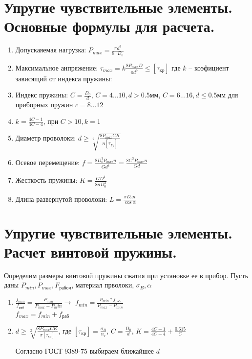 \documentclass{article}
\begin{document}
\begin{multicols}{3}
\section {\tiny Упругие чувствительные элементы. Основные формулы для расчета.}

\begin{enumerate}
	\item Допускаяемая нагрузка: $P_{max} = \frac{\pi d^3}{8 \cdot D_0} $
	\item Максимальное анпряжение: $\tau_{max} = k \frac{8 P_{max} D }{\pi d^3} \le [\tau_{кр}]$
	где $k$ -- коэфициент зависящий от индекса пружины:
	\item Индекс пружины: $C = \frac{D_0}{d} $, $C = 4 \dots 10, d > 0.5 мм$, $C = 6 \dots 16, d \le 0.5 мм$
	для приборных пружин $c = 8 \dots 12$
	\item $k = \frac{4 C - 1}{4 C - 4} $, при $C > 10, k = 1$
	\item Диаметр проволоки: $d \ge \sqrt[2]{ \frac{8 P_{max} C K}{n [\tau_{F_p}]} }$
	\item Осевое перемещение: $f = \frac{8 D_0^3 P_{max} n}{G d^4} = \frac{8 C^3 P_{max} n}{G d } $
	\item Жесткость пружины: $K = \frac{G D^4}{8 n D_0^3} $
	\item Длина развернутой проволоки: $L = \frac{\pi D_0 n}{\cos{ \alpha}} $
\end{enumerate}

\section {\tiny Упругие чувствительные элементы. Расчет винтовой пружины.}

Определим размеры винтовой пружины сжатия при установке ее в прибор.
Пусть даны $P_{min}, P_{max}, F_{рабоч}$, материал прволоки, $\sigma_{B}, \alpha$
\begin{enumerate}
	\item $ \frac{f_{min}}{f_{раб}} = \frac{P_{min}}{P_{max} - P_min} \to $
	$f_{min} = \frac{P_{min} * f_{раб}}{P_{max} - P_{min}} $\\
	$f_{max} = f_{min} + f_{раб}$
	\item $d \ge \sqrt[2]{ \frac{8 P_{max} C K}{\pi [\tau_{кр}]} }$, где $[\tau_{кр}] = \frac{\sigma_{B}}{n_т}$,
	$C = \frac{D_0}{d } $,
	$K = \frac{4 C - 1}{4 C - 4} + \frac{0.615}{C} $
	
	Согласно ГОСТ 9389-75 выбираем ближайшее $d$


\end{enumerate}
\end{multicols}
\end{document}
